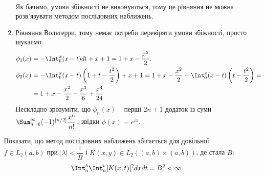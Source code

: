 \begin{solution}
\begin{enumerate}
\[\begin{split}
            \end{split}
        \]
        Як бачимо, умови збіжності не виконуються, тому це рівняння не можна розв'язувати методом послідовних наближень.
        \item Рівняння Вольтерри, тому немає потреби перевіряти умови збіжності, просто шукаємо 
        \begin{equation*}
            \begin{split}
                \phi_1(x) &= -\Int_0^x (x-t) dt + x + 1 = 1 + x - \dfrac{x^2}{2}. \\
                \phi_2(x) &= -\Int_0^x (x-t) \left(1 + t - \dfrac{t^2}{2}\right) + x + 1 = 1 + x - \dfrac{x^2}{2} -\Int_0^x (x-t) \left(t - \dfrac{t^2}{2}\right) = \\
                &= 1 + x - \dfrac{x^2}{2} - \dfrac{x^3}{6} + \dfrac{x^4}{24}
            \end{split}
        \end{equation*}
        Нескладно зрозуміти, що $\phi_n(x)$ -- перші $2n+1$ додаток із суми $\Sum_{n=0}^\infty (-1)^{[n/2]} \dfrac{x^n}{n!}$, звідки $\phi(x) = e^{ix}$.
    \end{enumerate}
\end{solution}

\begin{problem}
    Показати, що метод послідовних наближень збігається для довільної $f \in L_2(a, b)$ при $|\lambda| < \dfrac1B$ і $K(x, y) \in L_2((a, b) \times (a, b))$, де стала $B$: 
    \[
        \Int_a^b \Int_a^b |K(x, t)|^2 dx dt = B^2 < \infty.
    \]
\end{problem}

